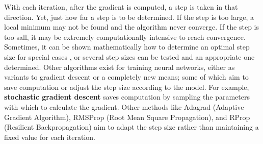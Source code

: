 With each iteration, after the gradient is computed, a step is taken in that direction.  Yet, just how far a step is to be determined.  If the step is too large, a local minimum may not be found and the algorithm never converge.  If the step is too sall, it may be extremely computationally intensive to reach convergence.  Sometimes, it can be shown mathematically how to determine an optimal step size for special cases \cite{nar2018step}, or several step sizes can be tested \cite{Goodfellow-et-al-2016} and an appropriate one determined.  Other algorithms exist for training neural networks, either as variants to gradient descent or a completely new means; some of which aim to save computation or adjust the step size according to the model.  For example, \textbf{stochastic gradient descent} saves computation by sampling the parameters with which to calculate the gradient.  Other methods like Adagrad (Adaptive Gradient Algorithm), RMSProp (Root Mean Square Propagation), and RProp (Resilient Backpropagation)\cite{rproprprop} aim to adapt the step size rather than maintaining a fixed value for each iteration.